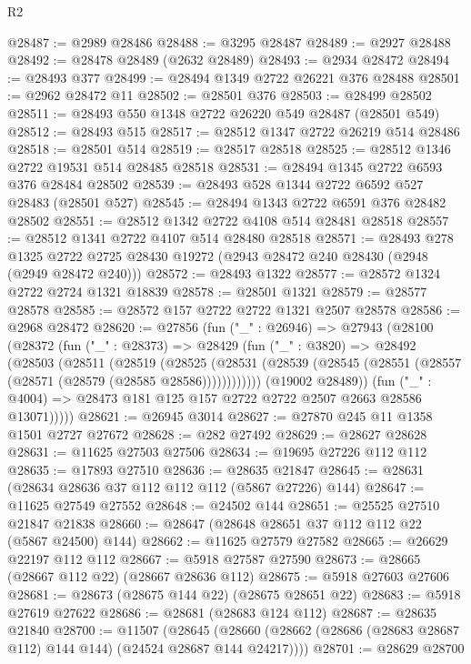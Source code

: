 \begin{lexlean}{R2}
\begin{coremodule}
@28487 := @2989 @28486
@28488 := @3295 @28487
@28489 := @2927 @28488
@28492 := @28478 @28489 (@2632 @28489)
@28493 := @2934 @28472
@28494 := @28493 @377
@28499 := @28494 @1349 @2722 @26221 @376 @28488
@28501 := @2962 @28472 @11
@28502 := @28501 @376
@28503 := @28499 @28502
@28511 := @28493 @550 @1348 @2722 @26220 @549 @28487 (@28501 @549)
@28512 := @28493 @515
@28517 := @28512 @1347 @2722 @26219 @514 @28486
@28518 := @28501 @514
@28519 := @28517 @28518
@28525 := @28512 @1346 @2722 @19531 @514 @28485 @28518
@28531 := @28494 @1345 @2722 @6593 @376 @28484 @28502
@28539 := @28493 @528 @1344 @2722 @6592 @527 @28483 (@28501 @527)
@28545 := @28494 @1343 @2722 @6591 @376 @28482 @28502
@28551 := @28512 @1342 @2722 @4108 @514 @28481 @28518
@28557 := @28512 @1341 @2722 @4107 @514 @28480 @28518
@28571 := @28493
    @278
    @1325
    @2722
    @2725
    @28430
    @19272
    (@2943 @28472 @240 @28430 (@2948 (@2949 @28472 @240)))
@28572 := @28493 @1322
@28577 := @28572 @1324 @2722 @2724 @1321 @18839
@28578 := @28501 @1321
@28579 := @28577 @28578
@28585 := @28572 @157 @2722 @2722 @1321 @2507 @28578
@28586 := @2968 @28472
@28620 := @27856
    (fun ("_" : @26946) =>
    @27943
      (@28100
        (@28372
          (fun ("_" : @28373) =>
          @28429
            (fun ("_" : @3820) =>
            @28492
              (@28503
                (@28511
                  (@28519
                    (@28525
                      (@28531
                        (@28539 (@28545 (@28551 (@28557 (@28571 (@28579 (@28585 @28586))))))))))))
              (@19002 @28489))
            (fun ("_" : @4004) => @28473 @181 @125 @157 @2722 @2722 @2507 @2663 @28586 @13071)))))
@28621 := @26945 @3014
@28627 := @27870 @245 @11 @1358 @1501 @2727 @27672
@28628 := @282 @27492
@28629 := @28627 @28628
@28631 := @11625 @27503 @27506
@28634 := @19695 @27226 @112 @112
@28635 := @17893 @27510
@28636 := @28635 @21847
@28645 := @28631 (@28634 @28636 @37 @112 @112 @112 (@5867 @27226) @144)
@28647 := @11625 @27549 @27552
@28648 := @24502 @144
@28651 := @25525 @27510 @21847 @21838
@28660 := @28647 (@28648 @28651 @37 @112 @112 @22 (@5867 @24500) @144)
@28662 := @11625 @27579 @27582
@28665 := @26629 @22197 @112 @112
@28667 := @5918 @27587 @27590
@28673 := @28665 (@28667 @112 @22) (@28667 @28636 @112)
@28675 := @5918 @27603 @27606
@28681 := @28673 (@28675 @144 @22) (@28675 @28651 @22)
@28683 := @5918 @27619 @27622
@28686 := @28681 (@28683 @124 @112)
@28687 := @28635 @21840
@28700 := @11507
    (@28645 (@28660 (@28662 (@28686 (@28683 @28687 @112) @144 @144) (@24524 @28687 @144 @24217))))
@28701 := @28629 @28700

\end{coremodule}
\end{lexlean}
